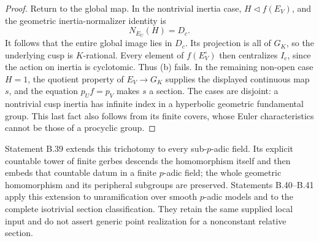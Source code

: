 \begin{proof}
Return to the global map. In the nontrivial inertia case,
$H\triangleleft f(E_V)$, and the geometric inertia-normalizer
identity is
\[
 N_{E_U}(H)=D_c.
\]
It follows that the entire global image lies in $D_c$. Its
projection is all of $G_K$, so the underlying cusp is
$K$-rational. Every element of $f(E_V^\circ)$ then centralizes
$I_c$, since the action on inertia is cyclotomic. Thus (b)
fails. In the remaining non-open case $H=1$, the quotient
property of $E_V\to G_K$ supplies the displayed continuous
map $s$, and the equation $p_Uf=p_V$ makes $s$ a section.
The cases are disjoint: a nontrivial cusp inertia has infinite
index in a hyperbolic geometric fundamental group. This last
fact also follows from its finite covers, whose Euler
characteristics cannot be those of a procyclic group.
\end{proof}

Statement B.39 extends this trichotomy to every sub-$p$-adic
field. Its explicit countable tower of finite gerbes descends
the homomorphism itself and then embeds that countable datum
in a finite $p$-adic field; the whole geometric homomorphism
and its peripheral subgroups are preserved. Statements
B.40--B.41 apply this extension to unramification over smooth
$p$-adic models and to the complete isotrivial section
classification. They retain the same supplied local input
and do not assert generic point realization for a nonconstant
relative section.

